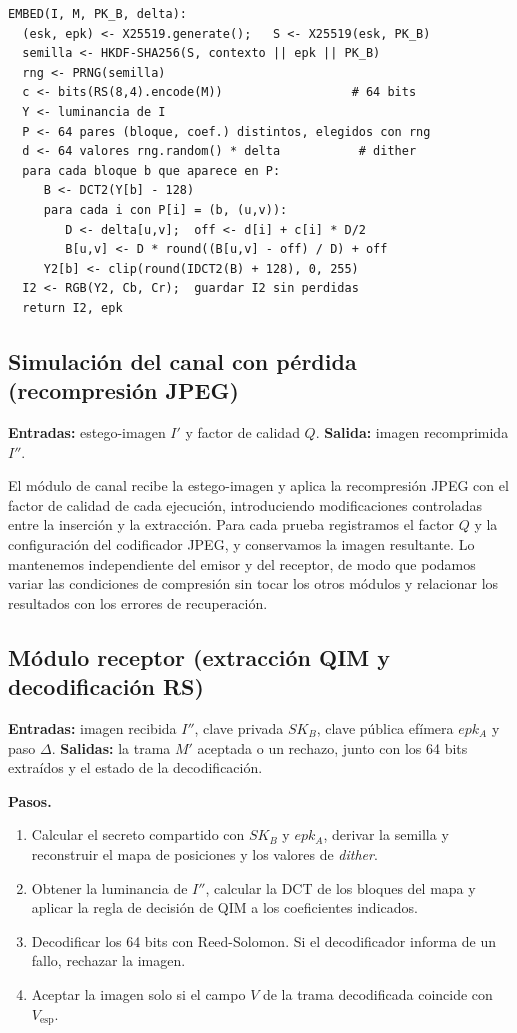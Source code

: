 \documentclass[IB]{TFUOC}%
\begin{document}
\begin{small}
\begin{verbatim}
EMBED(I, M, PK_B, delta):
  (esk, epk) <- X25519.generate();   S <- X25519(esk, PK_B)
  semilla <- HKDF-SHA256(S, contexto || epk || PK_B)
  rng <- PRNG(semilla)
  c <- bits(RS(8,4).encode(M))                  # 64 bits
  Y <- luminancia de I
  P <- 64 pares (bloque, coef.) distintos, elegidos con rng
  d <- 64 valores rng.random() * delta           # dither
  para cada bloque b que aparece en P:
     B <- DCT2(Y[b] - 128)
     para cada i con P[i] = (b, (u,v)):
        D <- delta[u,v];  off <- d[i] + c[i] * D/2
        B[u,v] <- D * round((B[u,v] - off) / D) + off
     Y2[b] <- clip(round(IDCT2(B) + 128), 0, 255)
  I2 <- RGB(Y2, Cb, Cr);  guardar I2 sin perdidas
  return I2, epk
\end{verbatim}
\end{small}

\subsection{Simulación del canal con pérdida (recompresión JPEG)}
\label{subsec:simulacion_canal}

\textbf{Entradas:} estego-imagen $I'$ y factor de calidad $Q$. \textbf{Salida:} imagen recomprimida $I''$.

El módulo de canal recibe la estego-imagen y aplica la recompresión JPEG con el factor de calidad de cada ejecución, introduciendo modificaciones controladas entre la inserción y la extracción. Para cada prueba registramos el factor $Q$ y la configuración del codificador JPEG, y conservamos la imagen resultante. Lo mantenemos independiente del emisor y del receptor, de modo que podamos variar las condiciones de compresión sin tocar los otros módulos y relacionar los resultados con los errores de recuperación.

\subsection{Módulo receptor (extracción QIM y decodificación RS)}
\label{subsec:modulo_receptor}

\textbf{Entradas:} imagen recibida $I''$, clave privada $SK_B$, clave pública efímera $epk_A$ y paso $\Delta$. \textbf{Salidas:} la trama $M'$ aceptada o un rechazo, junto con los 64 bits extraídos y el estado de la decodificación.

\textbf{Pasos.}
\begin{enumerate}
    \item Calcular el secreto compartido con $SK_B$ y $epk_A$, derivar la semilla y reconstruir el mapa de posiciones y los valores de \textit{dither}.
    \item Obtener la luminancia de $I''$, calcular la DCT de los bloques del mapa y aplicar la regla de decisión de QIM a los coeficientes indicados.
    \item Decodificar los 64 bits con Reed-Solomon. Si el decodificador informa de un fallo, rechazar la imagen.
    \item Aceptar la imagen solo si el campo $V$ de la trama decodificada coincide con $V_{\mathrm{esp}}$.
\end{enumerate}
\end{document}
